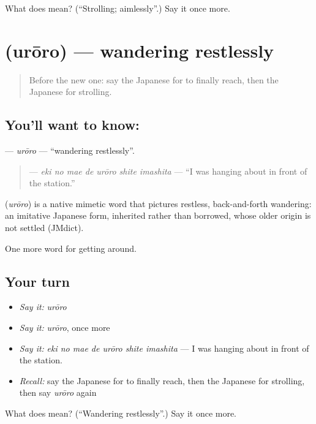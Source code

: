 \begin{tcolorbox}[breakable,colback=teal!4,colframe=teal!35!black,title={Before you move on}]
What does  mean? (\textquotedblleft{}Strolling; aimlessly\textquotedblright{}.) Say it once more.
\end{tcolorbox}
\section[\texorpdfstring{\ja{うろうろ} (urōro)}{うろうろ (urōro)}]{ (urōro) — wandering restlessly}

\label{lesson:JA-C396-urouro}



\begin{quote}
Before the new one: say the Japanese for to finally reach, then the Japanese for strolling.
\end{quote}

\subsection*{You'll want to know: }
\textbf{} — \emph{urōro} — \textquotedblleft{}wandering restlessly\textquotedblright{}.

\begin{quote}
\textbf{  } — \emph{eki no mae de urōro shite imashita} — \textquotedblleft{}I was hanging about in front of the station.\textquotedblright{}
\end{quote}

\begin{cousinweb}
\textbf{} (\emph{urōro}) is a native mimetic word that pictures restless, back-and-forth wandering: an imitative Japanese form, inherited rather than borrowed, whose older origin is not settled (JMdict).
\end{cousinweb}

\begin{grammarlens}[title={What you've built}]
One more word for getting around.
\end{grammarlens}

\subsection*{Your turn}
\begin{itemize}
\raggedright
  \item \emph{Say it:} \emph{urōro}
  \item \emph{Say it:} \emph{urōro}, once more
  \item \emph{Say it:} \emph{eki no mae de urōro shite imashita} — I was hanging about in front of the station.
  \item \emph{Recall:} say the Japanese for to finally reach, then the Japanese for strolling, then say \emph{urōro} again
\end{itemize}

\begin{tcolorbox}[breakable,colback=teal!4,colframe=teal!35!black,title={Before you move on}]
What does  mean? (\textquotedblleft{}Wandering restlessly\textquotedblright{}.) Say it once more.
\end{tcolorbox}

